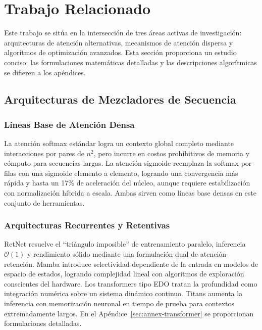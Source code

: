 \section{Trabajo Relacionado}

Este trabajo se sitúa en la intersección de tres áreas activas de investigación: arquitecturas de atención alternativas, mecanismos de atención dispersa y algoritmos de optimización avanzados. Esta sección proporciona un estudio conciso; las formulaciones matemáticas detalladas y las descripciones algorítmicas se difieren a los apéndices.

\subsection{Arquitecturas de Mezcladores de Secuencia}

\subsubsection{Líneas Base de Atención Densa}
La atención softmax estándar \citep{vaswani_attention_2017} logra un contexto global completo mediante interacciones por pares de $n^2$, pero incurre en costos prohibitivos de memoria y cómputo para secuencias largas. La atención sigmoide \citep{ramapuram_theory_2024} reemplaza la softmax por filas con una sigmoide elemento a elemento, logrando una convergencia más rápida y hasta un 17\% de aceleración del núcleo, aunque requiere estabilización con normalización híbrida a escala. Ambas sirven como líneas base densas en este conjunto de herramientas.

\subsubsection{Arquitecturas Recurrentes y Retentivas}
RetNet \citep{sun_retentive_2023} resuelve el ``triángulo imposible'' de entrenamiento paralelo, inferencia $\mathcal{O}(1)$ y rendimiento sólido mediante una formulación dual de atención-retención. Mamba \citep{gu_mamba_2023} introduce selectividad dependiente de la entrada en modelos de espacio de estados, logrando complejidad lineal con algoritmos de exploración conscientes del hardware. Los transformers tipo EDO \citep{zhang_continuous_2021} tratan la profundidad como integración numérica sobre un sistema dinámico continuo. Titans \citep{behrouz_titans_2025} aumenta la inferencia con memorización neuronal en tiempo de prueba para contextos extremadamente largos. En el Apéndice~\ref{sec:annex-transformer} se proporcionan formulaciones detalladas.

